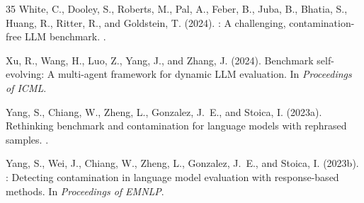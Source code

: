 \documentclass[letterpaper,11pt]{article}
\begin{document}
\begin{thebibliography}{35}
White, C., Dooley, S., Roberts, M., Pal, A., Feber, B., Juba, B., Bhatia, S., Huang, R., Ritter, R., and Goldstein, T. (2024).
: A challenging, contamination-free {LLM} benchmark.
.

Xu, R., Wang, H., Luo, Z., Yang, J., and Zhang, J. (2024).
\newblock Benchmark self-evolving: A multi-agent framework for dynamic {LLM} evaluation.
\newblock In {\em Proceedings of ICML}.

Yang, S., Chiang, W., Zheng, L., Gonzalez, J.~E., and Stoica, I. (2023a).
\newblock Rethinking benchmark and contamination for language models with rephrased samples.
.

Yang, S., Wei, J., Chiang, W., Zheng, L., Gonzalez, J.~E., and Stoica, I. (2023b).
: Detecting contamination in language model evaluation with response-based methods.
\newblock In {\em Proceedings of EMNLP}.

\end{thebibliography}
\end{document}

